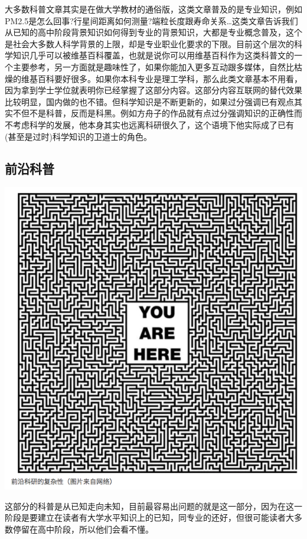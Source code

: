 \documentclass[]{book}
\begin{document}
大多数科普文章其实是在做大学教材的通俗版，这类文章普及的是专业知识，例如PM2.5是怎么回事?行星间距离如何测量?端粒长度跟寿命关系\ldots{}这类文章告诉我们从已知的高中阶段背景知识如何得到专业的背景知识，大都是专业概念普及，这个是社会大多数人科学背景的上限，却是专业职业化要求的下限。目前这个层次的科学知识几乎可以被维基百科覆盖，也就是说你可以用维基百科作为这类科普文的一个主要参考，另一方面就是趣味性了，如果你能加入更多互动跟多媒体，自然比枯燥的维基百科要好很多。如果你本科专业是理工学科，那么此类文章基本不用看，因为拿到学士学位就表明你已经掌握了这部分内容。这部分内容互联网的替代效果比较明显，国内做的也不错。但科学知识是不断更新的，如果过分强调已有观点其实不但不是科普，反而是科黑。例如方舟子的作品就有点过分强调知识的正确性而不考虑科学的发展，他本身其实也远离科研很久了，这个语境下他实际成了已有(甚至是过时)科学知识的卫道士的角色。

\subsection{前沿科普}

\includegraphics[width=8.21in]{images/pops4}

这部分的科普是从已知走向未知，目前最容易出问题的就是这一部分，因为在这一阶段是要建立在读者有大学水平知识上的已知，同专业的还好，但很可能读者大多数停留在高中阶段，所以他们会看不懂。
\end{document}
